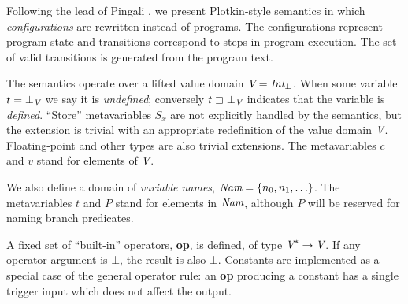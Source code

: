 \documentclass[12pt,titlepage,twoside]{article}
\newcommand{\sgt}{\sqsupset}%
\begin{document}
Following the lead of Pingali \cite{pingali90:dfg}, we present Plotkin-style
semantics \cite{plotkin81:opsem} in which \emph{configurations} are
rewritten instead of programs.  The configurations represent program
state and transitions correspond to steps in program execution.  The
set of valid transitions is generated from the program text.

The semantics operate over a lifted value domain
${\mbox{\em V}}={\mbox{\em Int}}_\bot$. When some variable
$t = \bot_{\mbox{\scriptsize\em V}}$ we say it is
\emph{undefined}; conversely $t\sgt\bot_\domainsm{V}$ indicates that the
variable is \emph{defined}.  ``Store'' metavariables $S_x$ are not
explicitly handled by the semantics, but the extension is trivial with
an appropriate redefinition of the value domain ${\mbox{\em V}}$.  Floating-point
and other types are also trivial extensions.  The
metavariables $c$ and $v$ stand for elements of ${\mbox{\em V}}$.

We also define a domain of \emph{variable names},
${\mbox{\em Nam}}=\left\{n_0,n_1,\ldots\right\}$.  The metavariables $t$ and $P$ stand for
elements in ${\mbox{\em Nam}}$, although $P$ will be reserved for naming branch predicates.

A fixed set of ``built-in'' operators, \textbf{op}, is defined,
of type ${\mbox{\em V}}^* \to {\mbox{\em V}}$.  If any operator argument is $\bot$, the
result is also $\bot$.  Constants are implemented as a special case of
the general operator rule: an \textbf{op} producing a constant has a
single trigger input which does not affect the output.
\end{document}
